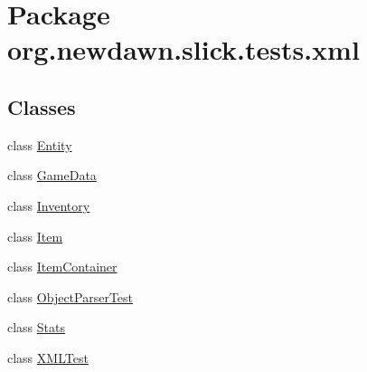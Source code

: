 \hypertarget{namespaceorg_1_1newdawn_1_1slick_1_1tests_1_1xml}{}\section{Package org.\+newdawn.\+slick.\+tests.\+xml}
\label{namespaceorg_1_1newdawn_1_1slick_1_1tests_1_1xml}
\subsection*{Classes}
\begin{DoxyCompactItemize}
\item 
class \mbox{\hyperlink{classorg_1_1newdawn_1_1slick_1_1tests_1_1xml_1_1_entity}{Entity}}
\item 
class \mbox{\hyperlink{classorg_1_1newdawn_1_1slick_1_1tests_1_1xml_1_1_game_data}{Game\+Data}}
\item 
class \mbox{\hyperlink{classorg_1_1newdawn_1_1slick_1_1tests_1_1xml_1_1_inventory}{Inventory}}
\item 
class \mbox{\hyperlink{classorg_1_1newdawn_1_1slick_1_1tests_1_1xml_1_1_item}{Item}}
\item 
class \mbox{\hyperlink{classorg_1_1newdawn_1_1slick_1_1tests_1_1xml_1_1_item_container}{Item\+Container}}
\item 
class \mbox{\hyperlink{classorg_1_1newdawn_1_1slick_1_1tests_1_1xml_1_1_object_parser_test}{Object\+Parser\+Test}}
\item 
class \mbox{\hyperlink{classorg_1_1newdawn_1_1slick_1_1tests_1_1xml_1_1_stats}{Stats}}
\item 
class \mbox{\hyperlink{classorg_1_1newdawn_1_1slick_1_1tests_1_1xml_1_1_x_m_l_test}{X\+M\+L\+Test}}
\end{DoxyCompactItemize}
